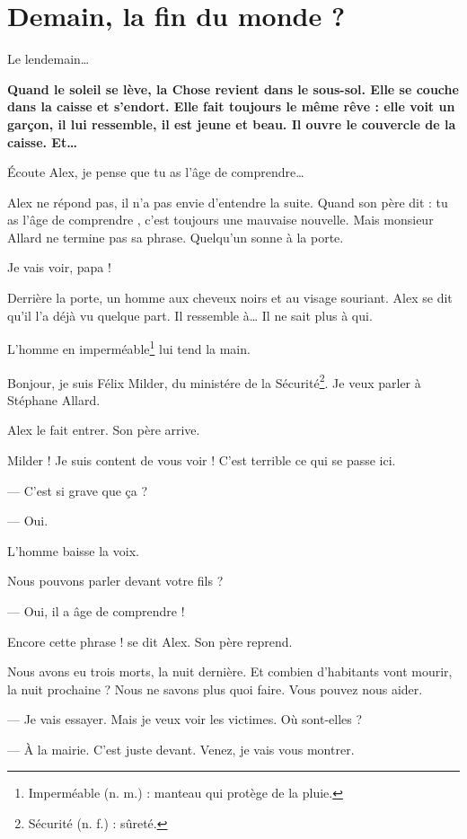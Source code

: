 \chapter{Demain, la fin du monde ?}
Le lendemain\ldots{}

\textbf{Quand le soleil se lève, la Chose revient dans le sous-sol. Elle se couche dans la caisse et s'endort. Elle fait toujours
le même rêve : elle voit un gar\c{c}on, il lui ressemble, il est jeune et beau. Il ouvre le couvercle de la caisse. Et\ldots{}}

\og Écoute Alex, je pense que tu as l'âge de comprendre\ldots{} \fg{}

Alex ne répond pas, il n'a pas envie d'entendre la suite. Quand son père dit : \og tu as l'âge de comprendre \fg{}, c'est
toujours une mauvaise nouvelle. Mais monsieur Allard ne termine pas sa phrase. Quelqu'un sonne à la porte.

\og Je vais voir, papa ! \fg{}

Derrière la porte, un homme aux cheveux noirs et au visage souriant. Alex se dit qu'il l'a déjà vu quelque part. Il ressemble
à\ldots{} Il ne sait plus à qui.

L'homme en imperméable\footnote{Imperméable (n. m.) : manteau qui protège de la pluie.} lui tend la main.

\og Bonjour, je suis Félix Milder, du ministére de la Sécurité\footnote{Sécurité (n. f.) : sûreté.}. Je veux parler à Stéphane
Allard. \fg{}

Alex le fait entrer. Son père arrive.

\og Milder ! Je suis content de vous voir ! C'est terrible ce qui se passe ici.

--- C'est si grave que \c{c}a ?

--- Oui. \fg{}

L'homme baisse la voix.

\og Nous pouvons parler devant votre fils ?

--- Oui, il a âge de comprendre ! \fg{}

Encore cette phrase ! se dit Alex. Son père reprend.

\og Nous avons eu trois morts, la nuit dernière. Et combien d'habitants vont mourir, la nuit prochaine ? Nous ne savons plus quoi
faire. Vous pouvez nous aider.

--- Je vais essayer. Mais je veux voir les victimes. Où sont-elles ?

--- À la mairie. C'est juste devant. Venez, je vais vous montrer. \fg{}

